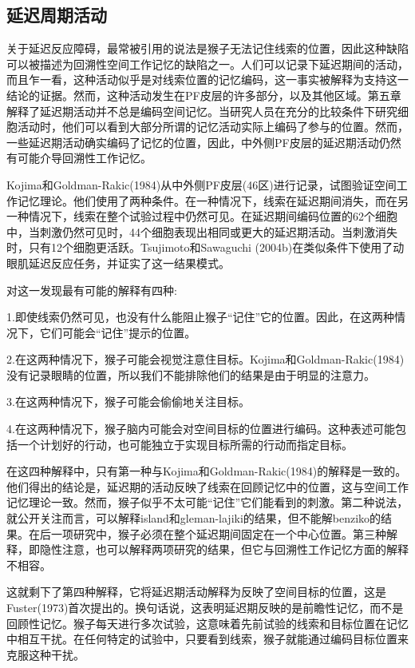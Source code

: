 \subsection{延迟周期活动}
关于延迟反应障碍，最常被引用的说法是猴子无法记住线索的位置，因此这种缺陷可以被描述为回溯性空间工作记忆的缺陷之一。人们可以记录下延迟期间的活动，而且乍一看，这种活动似乎是对线索位置的记忆编码，这一事实被解释为支持这一结论的证据。然而，这种活动发生在PF皮层的许多部分，以及其他区域。第五章解释了延迟期活动并不总是编码空间记忆。当研究人员在充分的比较条件下研究细胞活动时，他们可以看到大部分所谓的记忆活动实际上编码了参与的位置。然而，一些延迟期活动确实编码了记忆的位置，因此，中外侧PF皮层的延迟期活动仍然有可能介导回溯性工作记忆。

Kojima和Goldman-Rakic(1984)从中外侧PF皮层(46区)进行记录，试图验证空间工作记忆理论。他们使用了两种条件。在一种情况下，线索在延迟期间消失，而在另一种情况下，线索在整个试验过程中仍然可见。在延迟期间编码位置的62个细胞中，当刺激仍然可见时，44个细胞表现出相同或更大的延迟期活动。当刺激消失时，只有12个细胞更活跃。Tsujimoto和Sawaguchi (2004b)在类似条件下使用了动眼肌延迟反应任务，并证实了这一结果模式。

对这一发现最有可能的解释有四种:
\par
1.即使线索仍然可见，也没有什么能阻止猴子“记住”它的位置。因此，在这两种情况下，它们可能会“记住”提示的位置。
\par
2.在这两种情况下，猴子可能会视觉注意住目标。Kojima和Goldman-Rakic(1984)没有记录眼睛的位置，所以我们不能排除他们的结果是由于明显的注意力。
\par
3.在这两种情况下，猴子可能会偷偷地关注目标。
\par
4.在这两种情况下，猴子脑内可能会对空间目标的位置进行编码。这种表述可能包括一个计划好的行动，也可能独立于实现目标所需的行动而指定目标。

在这四种解释中，只有第一种与Kojima和Goldman-Rakic(1984)的解释是一致的。他们得出的结论是，延迟期的活动反映了线索在回顾记忆中的位置，这与空间工作记忆理论一致。然而，猴子似乎不太可能“记住”它们能看到的刺激。第二种说法，就公开关注而言，可以解释island和gleman-lajiki的结果，但不能解benziko的结果。在后一项研究中，猴子必须在整个延迟期间固定在一个中心位置。第三种解释，即隐性注意，也可以解释两项研究的结果，但它与回溯性工作记忆方面的解释不相容。

这就剩下了第四种解释，它将延迟期活动解释为反映了空间目标的位置，这是Fuster(1973)首次提出的。换句话说，这表明延迟期反映的是前瞻性记忆，而不是回顾性记忆。猴子每天进行多次试验，这意味着先前试验的线索和目标位置在记忆中相互干扰。在任何特定的试验中，只要看到线索，猴子就能通过编码目标位置来克服这种干扰。

